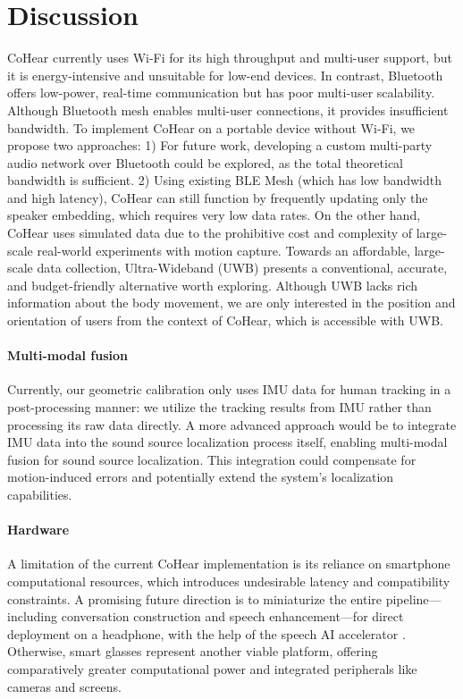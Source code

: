 \section{Discussion}
\label{sec:cohear_discuss}

CoHear currently uses Wi-Fi for its high throughput and multi-user support, but it is energy-intensive and unsuitable for low-end devices. In contrast, Bluetooth offers low-power, real-time communication but has poor multi-user scalability. Although Bluetooth mesh enables multi-user connections, it provides insufficient bandwidth.
To implement CoHear on a portable device without Wi-Fi, we propose two approaches: 1) For future work, developing a custom multi-party audio network over Bluetooth could be explored, as the total theoretical bandwidth is sufficient. 2) Using existing BLE Mesh (which has low bandwidth and high latency), CoHear can still function by frequently updating only the speaker embedding, which requires very low data rates.
On the other hand, CoHear uses simulated data due to the prohibitive cost and complexity of large-scale real-world experiments with motion capture. Towards an affordable, large-scale data collection, Ultra-Wideband (UWB) presents a conventional, accurate, and budget-friendly alternative worth exploring. Although UWB lacks rich information about the body movement, we are only interested in the position and orientation of users from the context of CoHear, which is accessible with UWB.

\paragraph{Multi-modal fusion}
Currently, our geometric calibration only uses IMU data for human tracking in a post-processing manner: we utilize the tracking results from IMU rather than processing its raw data directly. A more advanced approach would be to integrate IMU data into the sound source localization process itself, enabling multi-modal fusion for sound source localization. This integration could compensate for motion-induced errors and potentially extend the system's localization capabilities.

\paragraph{Hardware}
A limitation of the current CoHear implementation is its reliance on smartphone computational resources, which introduces undesirable latency and compatibility constraints. A promising future direction is to miniaturize the entire pipeline—including conversation construction and speech enhancement—for direct deployment on a headphone, with the help of the speech AI accelerator \cite{itani2025wireless}. Otherwise, smart glasses represent another viable platform, offering comparatively greater computational power and integrated peripherals like cameras and screens. 

